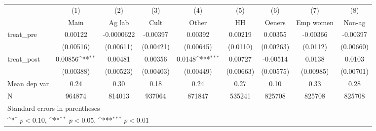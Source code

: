 {
\def\sym#1{\ifmmode^{#1}\else\(^{#1}\)\fi}
\begin{tabular}{l*{8}{c}}
\hline\hline
            &\multicolumn{1}{c}{(1)}&\multicolumn{1}{c}{(2)}&\multicolumn{1}{c}{(3)}&\multicolumn{1}{c}{(4)}&\multicolumn{1}{c}{(5)}&\multicolumn{1}{c}{(6)}&\multicolumn{1}{c}{(7)}&\multicolumn{1}{c}{(8)}\\
            &\multicolumn{1}{c}{Main}&\multicolumn{1}{c}{Ag lab}&\multicolumn{1}{c}{Cult}&\multicolumn{1}{c}{Other}&\multicolumn{1}{c}{HH}&\multicolumn{1}{c}{Oeners}&\multicolumn{1}{c}{Emp women}&\multicolumn{1}{c}{Non-ag}\\
\hline
treat\_pre   &     0.00122         &  -0.0000622         &    -0.00397         &     0.00392         &     0.00219         &     0.00355         &    -0.00366         &    -0.00397         \\
            &   (0.00516)         &   (0.00611)         &   (0.00421)         &   (0.00645)         &    (0.0110)         &   (0.00263)         &    (0.0112)         &   (0.00660)         \\
[1em]
treat\_post  &     0.00856\sym{**} &     0.00481         &     0.00356         &      0.0148\sym{***}&     0.00727         &    -0.00514         &      0.0138         &      0.0103         \\
            &   (0.00388)         &   (0.00523)         &   (0.00403)         &   (0.00449)         &   (0.00663)         &   (0.00575)         &   (0.00985)         &   (0.00701)         \\
\hline
Mean dep var&        0.24         &        0.30         &        0.18         &        0.24         &        0.27         &        0.10         &        0.33         &        0.28         \\
N           &      964874         &      814013         &      937064         &      871847         &      535241         &      825708         &      825708         &      825708         \\
\hline\hline
\multicolumn{9}{l}{\footnotesize Standard errors in parentheses}\\
\multicolumn{9}{l}{\footnotesize \sym{*} \(p<0.10\), \sym{**} \(p<0.05\), \sym{***} \(p<0.01\)}\\
\end{tabular}
}
